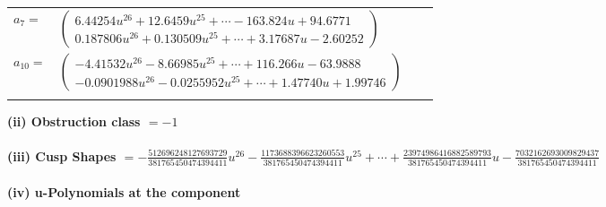 \documentclass[1p]{elsarticle_modified}
\theoremstyle{definition}
\begin{document}
\begin{tabular}{m{7pt} m{180pt} m{7pt} m{180pt} }
\flushright $a_{7}=$&$\begin{pmatrix}6.44254 u^{26}+12.6459 u^{25}+\cdots-163.824 u+94.6771\\0.187806 u^{26}+0.130509 u^{25}+\cdots+3.17687 u-2.60252\end{pmatrix}$ \\
\flushright $a_{10}=$&$\begin{pmatrix}-4.41532 u^{26}-8.66985 u^{25}+\cdots+116.266 u-63.9888\\-0.0901988 u^{26}-0.0255952 u^{25}+\cdots+1.47740 u+1.99746\end{pmatrix}$\\&\end{tabular}
\flushleft \textbf{(ii) Obstruction class $= -1$}\\~\\
\flushleft \textbf{(iii) Cusp Shapes $= -\frac{512696248127693729}{381765450474394411} u^{26}-\frac{1173688396623260553}{381765450474394411} u^{25}+\cdots+\frac{23974986416882589793}{381765450474394411} u-\frac{7032162693009829437}{381765450474394411}$}\\~\\
\newpage\renewcommand{\arraystretch}{1}
\flushleft \textbf{(iv) u-Polynomials at the component}\newline \\
\end{document}
